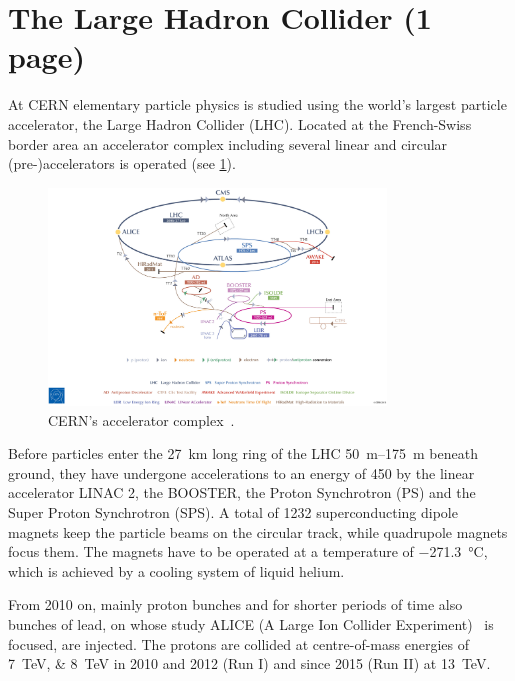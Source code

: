 
\section{The Large Hadron Collider (1 page)}
\label{sec:detector:lhc}

At CERN elementary particle physics is studied using the world's largest
particle accelerator, the Large Hadron Collider (LHC). Located at the
French-Swiss border area an accelerator complex including several linear and
circular (pre-)accelerators is operated (see
\cref{fig:detector:accelerators}).
\begin{figure}
\centering
\includegraphics[width=0.8\textwidth]{04-Detector/figs/CERN_complex.pdf}
\caption{CERN's accelerator complex~\cite{Marcastel:1621583}.}
\label{fig:detector:accelerators}
\end{figure}
Before particles enter the \SI{27}{\kilo\metre} long ring of the LHC
\SIrange[range-phrase={\,to\,}]{50}{175}{m} beneath ground, they have undergone
accelerations to an energy of \SI{450}{\gev} by the linear accelerator LINAC
2, the BOOSTER, the Proton Synchrotron (PS) and the Super Proton Synchrotron
(SPS). A total of 1232 superconducting dipole magnets keep the particle beams
on the circular track, while quadrupole magnets focus them. The magnets have
to be operated at a temperature of
\SI{-271.3}{\celsius}, which is achieved by a cooling system of liquid
helium.

From 2010 on, mainly proton bunches and for shorter periods of time also
bunches of lead, on whose study ALICE (A Large Ion Collider
Experiment)~\cite{ALICE} is focused, are injected. The protons are collided at
centre-of-mass energies of \SIlist{7;8}{\TeV} in 2010 and 2012 (Run I) and
since 2015 (Run II) at \SI{13}{\TeV}.
